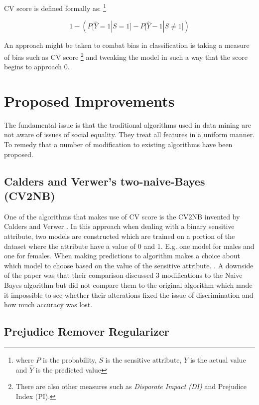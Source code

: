 \documentclass[a4paper, 12pt, notitlepage]{article}
\begin{document}
\vspace{0.5cm}

\pagebreak

CV score is defined formally as: \footnote{where $P$ is the probability, $S$ is the sensitive attribute, $Y$ is the actual value and $\hat{Y}$ is the predicted value}

\[
  1 - (P\big[ \hat{Y} = 1 | S = 1\big] - P \big[ \hat{Y} - 1 | S \neq 1 \big])
\] 

An approach might be taken to combat bias in classification is taking a measure of bias such as CV score \footnote{There are also other measures such as \emph{Disparate Impact (DI)} and Prejudice Index (PI).} and tweaking the model in such a way that the score begins to approach 0. 

\section*{Proposed Improvements}

The fundamental issue is that the traditional algorithms used in data mining are not aware of issues of social equality. They treat all features in a uniform manner. To remedy that a number of modification to existing algorithms have been proposed.

\subsection*{Calders and Verwer's two-naive-Bayes (CV2NB)}

One of the algorithms that makes use of CV score is the CV2NB invented by Calders and Verwer \cite{calders2010}. In this approach when dealing with a binary sensitive attribute, two models are constructed which are trained on a portion of the dataset where the attribute have a value of 0 and 1. E.g. one model for males and one for females. When making predictions to algorithm makes a choice about which model to choose based on the value of the sensitive attribute. \cite[p.~283]{calders2010}. A downside of the paper was that their comparison discussed 3 modifications to the Naive Bayes algorithm but did not compare them to the original algorithm which made it impossible to see whether their alterations fixed the issue of discrimination and how much accuracy was lost.

\subsection*{Prejudice Remover Regularizer}
\end{document}
